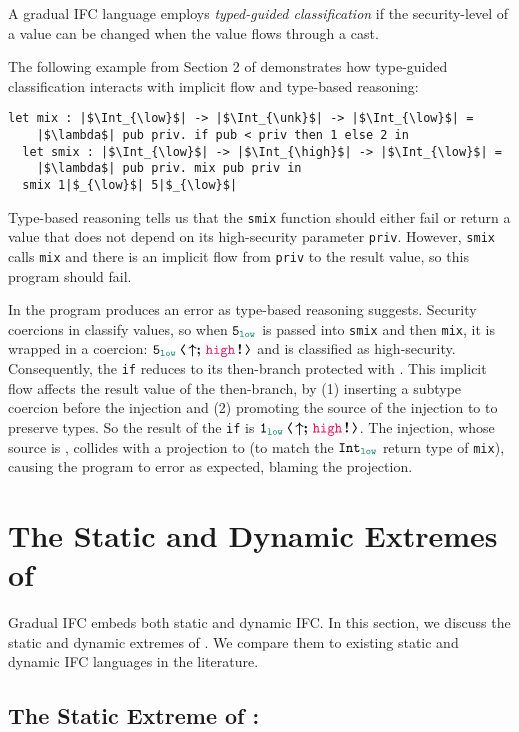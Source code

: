A gradual IFC language employs \textit{typed-guided classification} if the
security-level of a value can be changed when the value flows through a cast.

The following example from Section 2 of \textcite{Toro:2018aa} demonstrates how
type-guided classification interacts with implicit flow and type-based
reasoning:
\begin{lstlisting}[style=tt]
  let mix : |$\Int_{\low}$| -> |$\Int_{\unk}$| -> |$\Int_{\low}$| =
    |$\lambda$| pub priv. if pub < priv then 1 else 2 in
  let smix : |$\Int_{\low}$| -> |$\Int_{\high}$| -> |$\Int_{\low}$| =
    |$\lambda$| pub priv. mix pub priv in
  smix 1|$_{\low}$| 5|$_{\low}$|
\end{lstlisting}

\noindent Type-based reasoning tells us that the \texttt{smix} function should
either fail or return a value that does not depend on its high-security
parameter \texttt{priv}. However, \texttt{smix} calls \texttt{mix} and there is
an implicit flow from \texttt{priv} to the result value, so this program should
fail.

In \Surface the program produces an error as type-based reasoning suggests.
Security coercions in \CC classify values, so when $\key{5}_{\low}$ is passed
into \texttt{smix} and then \texttt{mix}, it is wrapped in a coercion:
$\cccast{\key{5}_{\low}}{\up\seq\inj{\high}}$ and is classified as
high-security.
%
Consequently, the \texttt{if} reduces to its then-branch protected with \high.
This implicit flow affects the result value of the then-branch, by (1) inserting
a subtype coercion before the injection and (2) promoting the source of the
injection to \high to preserve types. So the result of the \texttt{if} is
$\cccast{\key{1}_{\low}}{\up\seq\inj{\high}}$. The injection, whose source is
\high, collides with a projection to \low (to match the $\Int_{\low}$ return
type of \texttt{mix}), causing the program to error as expected, blaming the
projection.

\section{The Static and Dynamic Extremes of \Surface}
\label{sec:embedding}

Gradual IFC embeds both static and dynamic IFC. In this section, we discuss the
static and dynamic extremes of \Surface. We compare them to existing static and
dynamic IFC languages in the literature.

\subsection{The Static Extreme of \Surface: \SSLRef}

